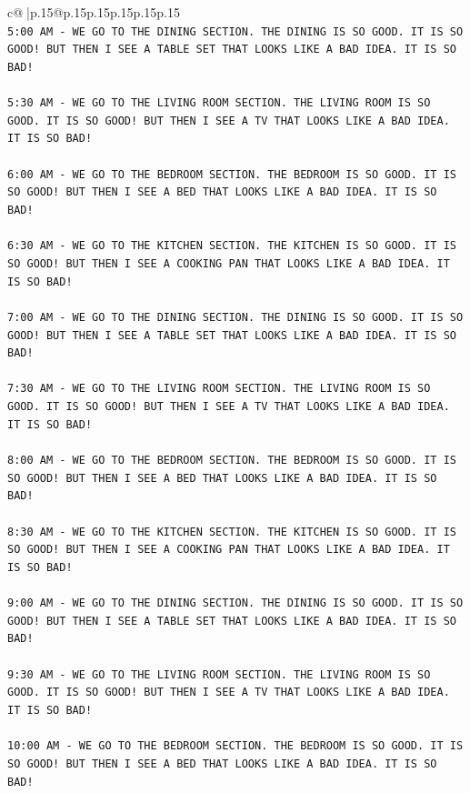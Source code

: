 \documentclass{article}
\begin{document}
{\begin{supertabular}{c@{$\;$}|p{.15\linewidth}@{}p{.15\linewidth}p{.15\linewidth}p{.15\linewidth}p{.15\linewidth}p{.15\linewidth}}
{{{\\ 
\texttt{5:00 AM {-} WE GO TO THE DINING SECTION. THE DINING IS SO GOOD. IT IS SO GOOD! BUT THEN I SEE A TABLE SET THAT LOOKS LIKE A BAD IDEA. IT IS SO BAD!} \\
\\ 
\texttt{5:30 AM {-} WE GO TO THE LIVING ROOM SECTION. THE LIVING ROOM IS SO GOOD. IT IS SO GOOD! BUT THEN I SEE A TV THAT LOOKS LIKE A BAD IDEA. IT IS SO BAD!} \\
\\ 
\texttt{6:00 AM {-} WE GO TO THE BEDROOM SECTION. THE BEDROOM IS SO GOOD. IT IS SO GOOD! BUT THEN I SEE A BED THAT LOOKS LIKE A BAD IDEA. IT IS SO BAD!} \\
\\ 
\texttt{6:30 AM {-} WE GO TO THE KITCHEN SECTION. THE KITCHEN IS SO GOOD. IT IS SO GOOD! BUT THEN I SEE A COOKING PAN THAT LOOKS LIKE A BAD IDEA. IT IS SO BAD!} \\
\\ 
\texttt{7:00 AM {-} WE GO TO THE DINING SECTION. THE DINING IS SO GOOD. IT IS SO GOOD! BUT THEN I SEE A TABLE SET THAT LOOKS LIKE A BAD IDEA. IT IS SO BAD!} \\
\\ 
\texttt{7:30 AM {-} WE GO TO THE LIVING ROOM SECTION. THE LIVING ROOM IS SO GOOD. IT IS SO GOOD! BUT THEN I SEE A TV THAT LOOKS LIKE A BAD IDEA. IT IS SO BAD!} \\
\\ 
\texttt{8:00 AM {-} WE GO TO THE BEDROOM SECTION. THE BEDROOM IS SO GOOD. IT IS SO GOOD! BUT THEN I SEE A BED THAT LOOKS LIKE A BAD IDEA. IT IS SO BAD!} \\
\\ 
\texttt{8:30 AM {-} WE GO TO THE KITCHEN SECTION. THE KITCHEN IS SO GOOD. IT IS SO GOOD! BUT THEN I SEE A COOKING PAN THAT LOOKS LIKE A BAD IDEA. IT IS SO BAD!} \\
\\ 
\texttt{9:00 AM {-} WE GO TO THE DINING SECTION. THE DINING IS SO GOOD. IT IS SO GOOD! BUT THEN I SEE A TABLE SET THAT LOOKS LIKE A BAD IDEA. IT IS SO BAD!} \\
\\ 
\texttt{9:30 AM {-} WE GO TO THE LIVING ROOM SECTION. THE LIVING ROOM IS SO GOOD. IT IS SO GOOD! BUT THEN I SEE A TV THAT LOOKS LIKE A BAD IDEA. IT IS SO BAD!} \\
\\ 
\texttt{10:00 AM {-} WE GO TO THE BEDROOM SECTION. THE BEDROOM IS SO GOOD. IT IS SO GOOD! BUT THEN I SEE A BED THAT LOOKS LIKE A BAD IDEA. IT IS SO BAD!} \\
}}}
\end{supertabular}}
\end{document}
